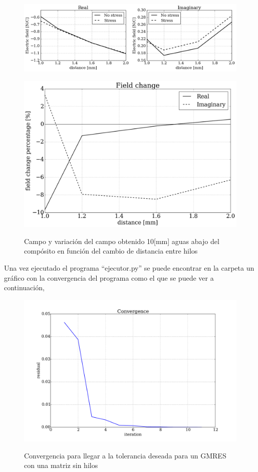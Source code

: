 \documentclass[12pt,letterpaper]{article}
\numberwithin{equation}{section}
\begin{document}
\begin{figure}[H]
	\centering\includegraphics[scale=0.6]{Imagenes/field_screen_comparision.png}\\
\end{figure} 
\begin{figure}[H]
	\centering\includegraphics[scale=0.35]{Imagenes/field_change.png}\\
	\caption{Campo y variación del campo obtenido 10[mm] aguas abajo del compósito en función del cambio de distancia entre hilos}
	\label{fig:field_change}
\end{figure}
\pagebreak 
Una vez ejecutado el programa ``ejecutor.py'' se puede encontrar en la carpeta un gráfico con la convergencia del programa como el que se puede ver a continuación,

\begin{figure}[H]
	\centering\includegraphics[scale=0.35]{Imagenes/Convergence.pdf}\\
	\caption{Convergencia para llegar a la tolerancia deseada para un GMRES con una matriz sin hilos}
	\label{fig:convergence}
\end{figure} 
\end{document}
